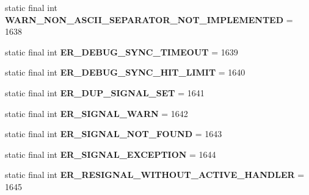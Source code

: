 \begin{DoxyCompactItemize}
static final int {\bfseries W\+A\+R\+N\+\_\+\+N\+O\+N\+\_\+\+A\+S\+C\+I\+I\+\_\+\+S\+E\+P\+A\+R\+A\+T\+O\+R\+\_\+\+N\+O\+T\+\_\+\+I\+M\+P\+L\+E\+M\+E\+N\+T\+ED} = 1638
\item 
\mbox{\label{classcom_1_1mysql_1_1jdbc_1_1_mysql_error_numbers_a3dbffdb735c707f13d26f14db6408ecf}} 
static final int {\bfseries E\+R\+\_\+\+D\+E\+B\+U\+G\+\_\+\+S\+Y\+N\+C\+\_\+\+T\+I\+M\+E\+O\+UT} = 1639
\item 
\mbox{\label{classcom_1_1mysql_1_1jdbc_1_1_mysql_error_numbers_a5d69ac64f2915808d60a85171bc6cb27}} 
static final int {\bfseries E\+R\+\_\+\+D\+E\+B\+U\+G\+\_\+\+S\+Y\+N\+C\+\_\+\+H\+I\+T\+\_\+\+L\+I\+M\+IT} = 1640
\item 
\mbox{\label{classcom_1_1mysql_1_1jdbc_1_1_mysql_error_numbers_a23e2bff0368122579fbcf0989b4d9ba9}} 
static final int {\bfseries E\+R\+\_\+\+D\+U\+P\+\_\+\+S\+I\+G\+N\+A\+L\+\_\+\+S\+ET} = 1641
\item 
\mbox{\label{classcom_1_1mysql_1_1jdbc_1_1_mysql_error_numbers_a859faac1f0097e5098a76d4b2fc8f8cc}} 
static final int {\bfseries E\+R\+\_\+\+S\+I\+G\+N\+A\+L\+\_\+\+W\+A\+RN} = 1642
\item 
\mbox{\label{classcom_1_1mysql_1_1jdbc_1_1_mysql_error_numbers_ad48bc6a3e38c3fba6d01689cfec4988f}} 
static final int {\bfseries E\+R\+\_\+\+S\+I\+G\+N\+A\+L\+\_\+\+N\+O\+T\+\_\+\+F\+O\+U\+ND} = 1643
\item 
\mbox{\label{classcom_1_1mysql_1_1jdbc_1_1_mysql_error_numbers_ac9e0cc50ed40d6c9238c789a7878f973}} 
static final int {\bfseries E\+R\+\_\+\+S\+I\+G\+N\+A\+L\+\_\+\+E\+X\+C\+E\+P\+T\+I\+ON} = 1644
\item 
\mbox{\label{classcom_1_1mysql_1_1jdbc_1_1_mysql_error_numbers_a96da2230c0bbcb587b3d4586b0705019}} 
static final int {\bfseries E\+R\+\_\+\+R\+E\+S\+I\+G\+N\+A\+L\+\_\+\+W\+I\+T\+H\+O\+U\+T\+\_\+\+A\+C\+T\+I\+V\+E\+\_\+\+H\+A\+N\+D\+L\+ER} = 1645

\end{DoxyCompactItemize}
